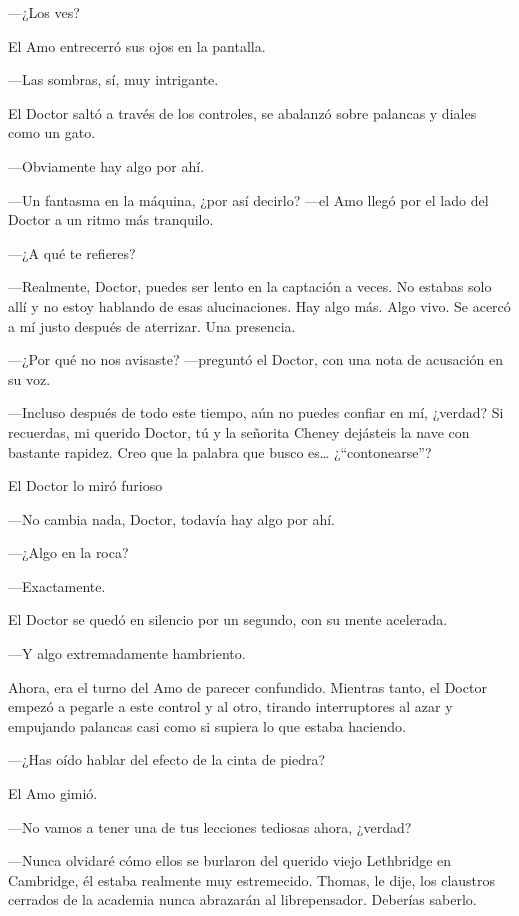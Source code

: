 {---¿Los ves?}

{El Amo entrecerró sus ojos en la pantalla.}

{---Las sombras, sí, muy intrigante.}

{El Doctor saltó a través de los controles, se abalanzó sobre palancas y
diales como un gato.}

{---Obviamente hay algo por ahí.}

{---Un fantasma en la máquina, ¿por así decirlo? ---el Amo llegó por el
lado del Doctor a un ritmo más tranquilo.}

{---¿A qué te refieres?}

{---Realmente, Doctor, puedes ser lento en la captación a veces. No
 estabas solo allí y no estoy hablando de esas alucinaciones. Hay algo
 más. Algo vivo. Se acercó a mí justo después de aterrizar. Una
presencia.}

{---¿Por qué no nos avisaste? ---preguntó el Doctor, con una nota de
acusación en su voz.}

{---Incluso después de todo este tiempo, aún no puedes confiar en mí,
 ¿verdad? Si recuerdas, mi querido Doctor, tú y la señorita Cheney
 dejásteis la nave con bastante rapidez. Creo que la palabra que busco
 es\ldots{} ¿``contonearse''?}

{El Doctor lo miró furioso}

{---No cambia nada, Doctor, todavía hay algo por ahí.}

{---¿Algo en la roca?}

{---Exactamente.}

{El Doctor se quedó en silencio por un segundo, con su mente acelerada.}

{---Y algo extremadamente hambriento.}

{Ahora, era el turno del Amo de parecer confundido. Mientras tanto, el
 Doctor empezó a pegarle a este control y al otro, tirando interruptores
 al azar y empujando palancas casi como si supiera lo que estaba
haciendo.}

{---¿Has oído hablar del efecto de la cinta de piedra?}

{El Amo gimió.}

{---No vamos a tener una de tus lecciones tediosas ahora, ¿verdad?}

{---Nunca olvidaré cómo ellos se burlaron del querido viejo Lethbridge en
 Cambridge, él estaba realmente muy estremecido. Thomas, le dije, los
 claustros cerrados de la academia nunca abrazarán al librepensador.
Deberías saberlo.}

